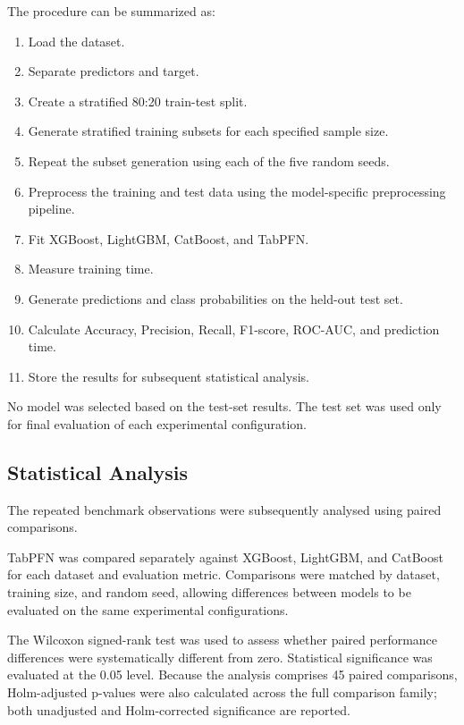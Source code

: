The procedure can be summarized as:

\begin{enumerate}
\def\labelenumi{\arabic{enumi}.}
\tightlist
\item
  Load the dataset.
\item
  Separate predictors and target.
\item
  Create a stratified 80:20 train-test split.
\item
  Generate stratified training subsets for each specified sample size.
\item
  Repeat the subset generation using each of the five random seeds.
\item
  Preprocess the training and test data using the model-specific preprocessing pipeline.
\item
  Fit XGBoost, LightGBM, CatBoost, and TabPFN.
\item
  Measure training time.
\item
  Generate predictions and class probabilities on the held-out test set.
\item
  Calculate Accuracy, Precision, Recall, F1-score, ROC-AUC, and prediction time.
\item
  Store the results for subsequent statistical analysis.
\end{enumerate}

No model was selected based on the test-set results. The test set was used only for final evaluation of each experimental configuration.

\subsection{Statistical Analysis}\label{statistical-analysis}

The repeated benchmark observations were subsequently analysed using paired comparisons.

TabPFN was compared separately against XGBoost, LightGBM, and CatBoost for each dataset and evaluation metric. Comparisons were matched by dataset, training size, and random seed, allowing differences between models to be evaluated on the same experimental configurations.

The Wilcoxon signed-rank test was used to assess whether paired performance differences were systematically different from zero. Statistical significance was evaluated at the 0.05 level. Because the analysis comprises 45 paired comparisons, Holm-adjusted p-values were also calculated across the full comparison family; both unadjusted and Holm-corrected significance are reported.

